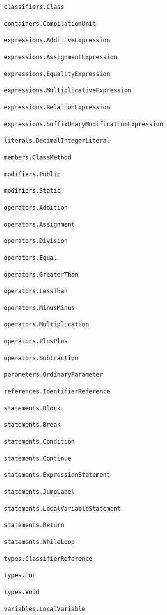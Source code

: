 \documentclass[11pt]{article}
\begin{document}
\begin{compactenum}
\item \verb|classifiers.Class|
\item \verb|containers.CompilationUnit|
\item \verb|expressions.AdditiveExpression|
\item \verb|expressions.AssignmentExpression|
\item \verb|expressions.EqualityExpression|
\item \verb|expressions.MultiplicativeExpression|
\item \verb|expressions.RelationExpression|
\item \verb|expressions.SuffixUnaryModificationExpression|
\item \verb|literals.DecimalIntegerLiteral|
\item \verb|members.ClassMethod|
\item \verb|modifiers.Public|
\item \verb|modifiers.Static|
\item \verb|operators.Addition|
\item \verb|operators.Assignment|
\item \verb|operators.Division|
\item \verb|operators.Equal|
\item \verb|operators.GreaterThan|
\item \verb|operators.LessThan|
\item \verb|operators.MinusMinus|
\item \verb|operators.Multiplication|
\item \verb|operators.PlusPlus|
\item \verb|operators.Subtraction|
\item \verb|parameters.OrdinaryParameter|
\item \verb|references.IdentifierReference|
\item \verb|statements.Block|
\item \verb|statements.Break|
\item \verb|statements.Condition|
\item \verb|statements.Continue|
\item \verb|statements.ExpressionStatement|
\item \verb|statements.JumpLabel|
\item \verb|statements.LocalVariableStatement|
\item \verb|statements.Return|
\item \verb|statements.WhileLoop|
\item \verb|types.ClassifierReference|
\item \verb|types.Int|
\item \verb|types.Void|
\item \verb|variables.LocalVariable|
\end{compactenum}
\end{document}
